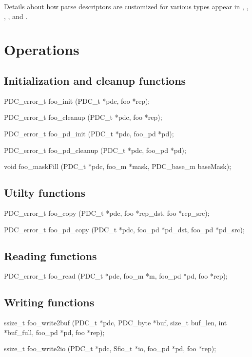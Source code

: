 Details about how parse descriptors are customized for various \PADS{}
types appear in
, ,
, , 
 and .

\section{Operations}
\label{common-operations}
\subsection{Initialization and cleanup functions}
\begin{code}
PDC_error_t foo_init (PDC_t *pdc, foo *rep);

PDC_error_t foo_cleanup (PDC_t *pdc, foo *rep);

PDC_error_t foo_pd_init (PDC_t *pdc, foo_pd *pd);

PDC_error_t foo_pd_cleanup (PDC_t *pdc, foo_pd *pd);

void foo_maskFill (PDC_t *pdc, foo_m *mask, PDC_base_m baseMask);

\end{code}

\subsection{Utilty functions}
\begin{code}
PDC_error_t foo_copy (PDC_t *pdc, foo *rep_dst, foo *rep_src);

PDC_error_t foo_pd_copy (PDC_t *pdc, foo_pd *pd_dst, foo_pd *pd_src);
\end{code}

\subsection{Reading functions}
\begin{code}
PDC_error_t foo_read (PDC_t *pdc, foo_m *m, foo_pd *pd, foo *rep);
\end{code}

\subsection{Writing functions}
\begin{code}
ssize_t foo_write2buf (PDC_t *pdc, PDC_byte *buf, size_t buf_len, 
                       int *buf_full, foo_pd *pd, foo *rep);

ssize_t foo_write2io (PDC_t *pdc, Sfio_t *io, foo_pd *pd, foo *rep);

\end{code}

